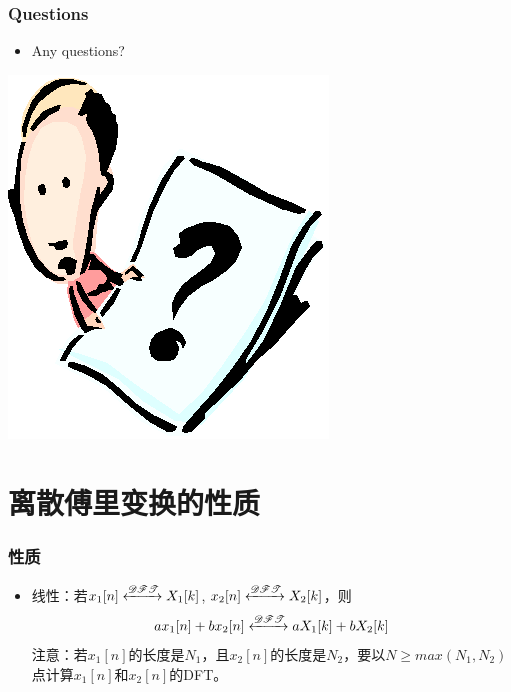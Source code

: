 \documentclass[CJKutf8,xcolor=pdftex,dvipsnames,table]{beamer}
\begin{document}
\begin{CJK*}{UTF8}{song}
  \begin{frame}
    \frametitle{Questions}
    \begin{itemize}
    \item Any questions?
    \end{itemize}
    \begin{center}
      \includegraphics[scale=.5]{question}
    \end{center}
  \end{frame}   
  
	\section{离散傅里变换的性质}
	
  \begin{frame}
    \frametitle{性质}
    \begin{itemize}
    \item 线性：若$x_1[n] \xleftrightarrow{\mathscr{DFT}} X_1[k]$, $x_2[n] \xleftrightarrow{\mathscr{DFT}} X_2[k]$，则
    \[
    ax_1[n]+bx_2[n] \xleftrightarrow{\mathscr{DFT}} aX_1[k]+bX_2[k]
    \]
    注意：若$x_1[n]$的长度是$N_1$，且$x_2[n]$的长度是$N_2$，要以$N \geq max(N_1, N_2)$点计算$x_1[n]$和$x_2[n]$的DFT。

	\end{itemize}
  \end{frame}  
      

\end{CJK*}
\end{document}

